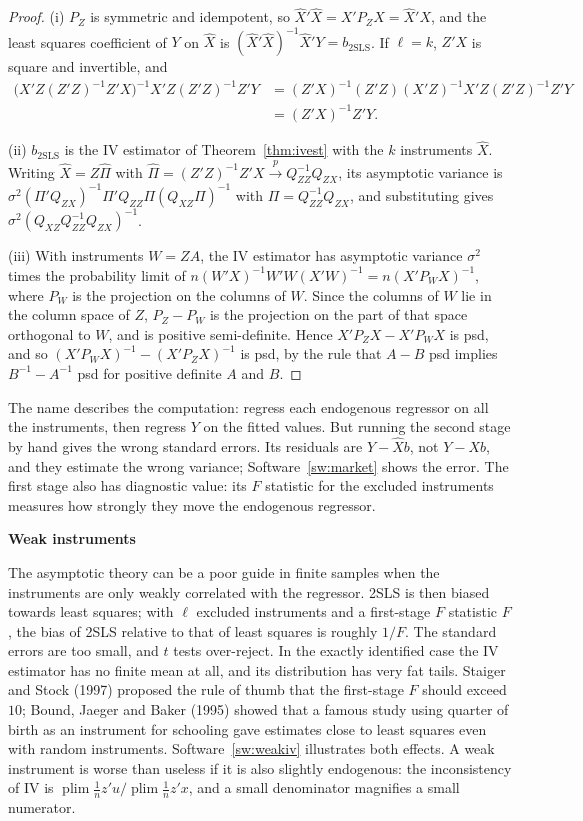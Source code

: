 \documentclass[11pt,a4paper]{article}
\numberwithin{equation}{section}
\DeclareMathOperator{\plim}{plim}
\theoremstyle{definition}
\newcommand{\subhead}[1]{%
  \par\medskip\noindent\textbf{#1}\par\nobreak\smallskip}
\begin{document}
\begin{proof}
(i) $P_Z$ is symmetric and idempotent, so $\hat X'\hat X = X'P_ZX = \hat X'X$, and the least squares coefficient of $Y$ on $\hat X$ is $(\hat X'\hat X)^{-1}\hat X'Y = b_{\text{2SLS}}$. If $\ell = k$, $Z'X$ is
square and invertible, and
\begin{align*}
\bigl(X'Z(Z'Z)^{-1}Z'X\bigr)^{-1}X'Z(Z'Z)^{-1}Z'Y &= (Z'X)^{-1}(Z'Z)(X'Z)^{-1}X'Z(Z'Z)^{-1}Z'Y\\
&= (Z'X)^{-1}Z'Y .
\end{align*}

(ii) $b_{\text{2SLS}}$ is the IV estimator of Theorem~\ref{thm:ivest} with the $k$ instruments $\hat X$. Writing $\hat X = Z\hat\Pi$ with $\hat\Pi = (Z'Z)^{-1}Z'X \xrightarrow{p} Q_{ZZ}^{-1}Q_{ZX}$, its
asymptotic variance is $\sigma^2(\Pi'Q_{ZX})^{-1}\Pi'Q_{ZZ}\Pi(Q_{XZ}\Pi)^{-1}$ with $\Pi = Q_{ZZ}^{-1}Q_{ZX}$, and substituting gives $\sigma^2(Q_{XZ}Q_{ZZ}^{-1}Q_{ZX})^{-1}$.

(iii) With instruments $W = ZA$, the IV estimator has asymptotic variance $\sigma^2$ times the probability limit of
$n(W'X)^{-1}W'W(X'W)^{-1} = n(X'P_WX)^{-1}$, where $P_W$ is the projection on the columns of $W$. Since the columns of $W$ lie in the column space of $Z$,
$P_Z - P_W$ is the projection on the part of that space orthogonal to $W$, and is positive semi-definite. Hence $X'P_ZX - X'P_WX$ is psd, and so
$(X'P_WX)^{-1} - (X'P_ZX)^{-1}$ is psd, by the rule that $A - B$ psd implies $B^{-1} - A^{-1}$ psd for positive definite $A$ and $B$.
\end{proof}

The name describes the computation: regress each endogenous regressor on all the instruments, then regress $Y$ on the fitted values. But running the
second stage by hand gives the wrong standard errors. Its residuals are $Y - \hat Xb$, not $Y - Xb$, and they estimate the wrong variance;
Software~\ref{sw:market} shows the error. The first stage also has diagnostic value: its $F$ statistic for the excluded instruments measures how
strongly they move the endogenous regressor.

\subhead{Weak instruments}
The asymptotic theory can be a poor guide in finite samples when the instruments are only weakly correlated with the regressor. 2SLS is then
biased towards least squares; with $\ell$ excluded instruments and a first-stage $F$ statistic $F$, the bias of 2SLS relative to that of least squares is
roughly $1/F$. The standard errors are too small, and $t$ tests over-reject. In the exactly identified case the IV estimator has no finite mean at all,
and its distribution has very fat tails. Staiger and Stock (1997) proposed the rule of thumb that the first-stage $F$ should exceed $10$; Bound, Jaeger and
Baker (1995) showed that a famous study using quarter of birth as an instrument for schooling gave estimates close to least squares even with
random instruments. Software~\ref{sw:weakiv} illustrates both effects. A weak instrument is worse than useless if it is also slightly
endogenous: the inconsistency of IV is $\plim\frac1n z'u/\plim\frac1n z'x$, and a small denominator magnifies a small numerator.
\end{document}
